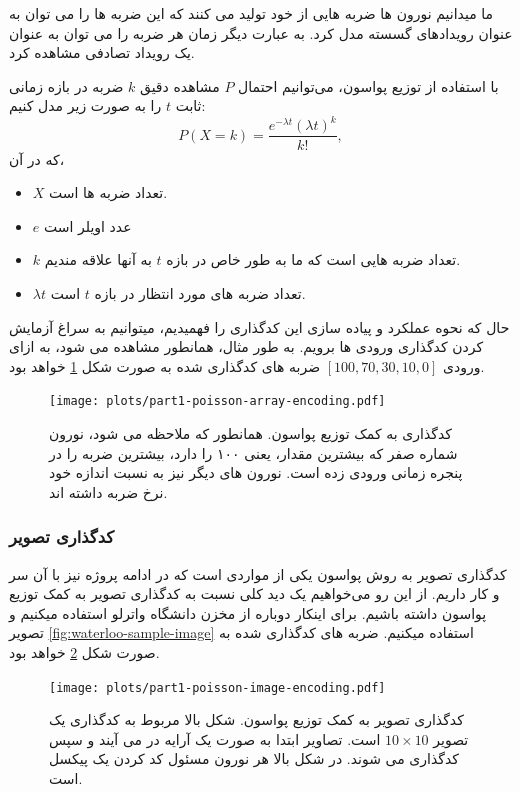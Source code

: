         ما میدانیم نورون ها ضربه هایی از خود تولید می کنند که این ضربه ها را می توان به عنوان رویدادهای گسسته مدل کرد. به عبارت دیگر زمان هر ضربه را می توان به عنوان یک رویداد تصادفی مشاهده کرد.
        
        با استفاده از توزیع پواسون، می‌توانیم احتمال 
        $P$ 
        مشاهده دقیق 
        $k$ 
        ضربه در بازه زمانی ثابت 
        $t$ 
        را به صورت زیر مدل کنیم:\cite{Poisson-Distribution-Wikipedia}
        \begin{equation}
            P(X=k)=\frac{e^{-\lambda t} {(\lambda t)}^{k}}{k!},
        \end{equation}
        که در آن، 
        \begin{itemize}
            \item $X$ تعداد ضربه ها است.
            \item $e$ عدد اویلر است
            \item $k$ تعداد ضربه هایی است که ما به طور خاص در بازه 
            $t$ 
            به آنها علاقه مندیم.
            \item $\lambda t$ تعداد ضربه های مورد انتظار در بازه 
            $t$ 
            است.
        \end{itemize}

        حال که نحوه عملکرد و پیاده سازی این کدگذاری را فهمیدیم، میتوانیم به سراغ آزمایش کردن کدگذاری ورودی ها برویم. به طور مثال، همانطور مشاهده می شود، به ازای ورودی 
        $[100, 70, 30, 10, 0]$ 
        ضربه های کدگذاری شده به صورت شکل
        \ref{fig:part1-poisson-array-encoding}
        خواهد بود.
        \begin{figure}[!ht]
            \centering
            \texttt{[image: plots/part1-poisson-array-encoding.pdf]} 
            \caption{کدگذاری به کمک توزیع پواسون. همانطور که ملاحظه می شود، نورون شماره صفر که بیشترین مقدار، یعنی ۱۰۰ را دارد، بیشترین ضربه را در پنجره زمانی ورودی زده است. نورون های دیگر نیز به نسبت اندازه خود نرخ ضربه داشته اند.}
            \label{fig:part1-poisson-array-encoding}
        \end{figure}

        \subsubsection*{کدگذاری تصویر}
            کدگذاری تصویر به روش پواسون یکی از مواردی است که در ادامه پروژه نیز با آن سر و کار داریم. از این رو می‌خواهیم یک دید کلی نسبت به کدگذاری تصویر به کمک توزیع پواسون داشته باشیم. برای اینکار دوباره از مخزن دانشگاه واترلو استفاده میکنیم و تصویر 
            \ref{fig:waterloo-sample-image}
            استفاده میکنیم. 
            ضربه های کدگذاری شده به صورت شکل
            \ref{fig:part1-poisson-image-encoding}
            خواهد بود.
            \begin{figure}[!ht]
                \centering
                \texttt{[image: plots/part1-poisson-image-encoding.pdf]} 
                \caption{کدگذاری تصویر به کمک توزیع پواسون. شکل بالا مربوط به کدگذاری یک تصویر 
                $10\times 10$ 
                است. تصاویر ابتدا به صورت یک آرایه در می آیند و سپس کدگذاری می شوند. در شکل بالا هر نورون مسئول کد کردن یک پیکسل است.}
                \label{fig:part1-poisson-image-encoding}
            \end{figure}